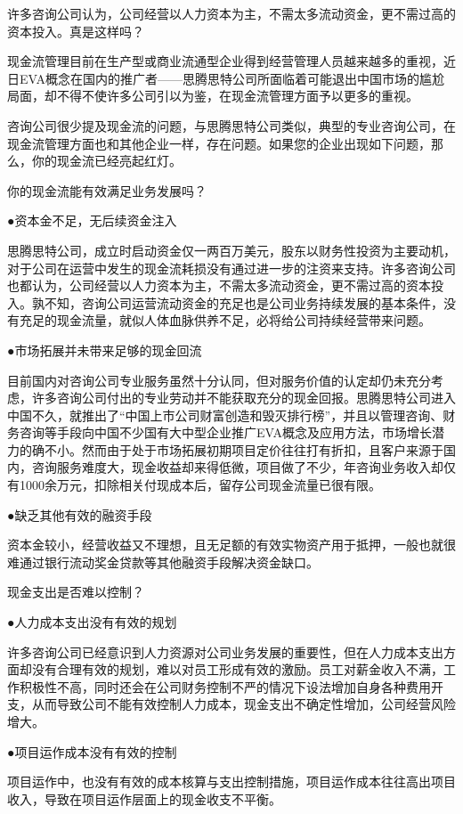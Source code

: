     许多咨询公司认为，公司经营以人力资本为主，不需太多流动资金，更不需过高的资本投入。真是这样吗？

    现金流管理目前在生产型或商业流通型企业得到经营管理人员越来越多的重视，近日EVA概念在国内的推广者——思腾思特公司所面临着可能退出中国市场的尴尬局面，却不得不使许多公司引以为鉴，在现金流管理方面予以更多的重视。

    咨询公司很少提及现金流的问题，与思腾思特公司类似，典型的专业咨询公司，在现金流管理方面也和其他企业一样，存在问题。如果您的企业出现如下问题，那么，你的现金流已经亮起红灯。

    你的现金流能有效满足业务发展吗？

    ●资本金不足，无后续资金注入

    思腾思特公司，成立时启动资金仅一两百万美元，股东以财务性投资为主要动机，对于公司在运营中发生的现金流耗损没有通过进一步的注资来支持。许多咨询公司也都认为，公司经营以人力资本为主，不需太多流动资金，更不需过高的资本投入。孰不知，咨询公司运营流动资金的充足也是公司业务持续发展的基本条件，没有充足的现金流量，就似人体血脉供养不足，必将给公司持续经营带来问题。

    ●市场拓展并未带来足够的现金回流

    目前国内对咨询公司专业服务虽然十分认同，但对服务价值的认定却仍未充分考虑，许多咨询公司付出的专业劳动并不能获取充分的现金回报。思腾思特公司进入中国不久，就推出了“中国上市公司财富创造和毁灭排行榜”，并且以管理咨询、财务咨询等手段向中国不少国有大中型企业推广EVA概念及应用方法，市场增长潜力的确不小。然而由于处于市场拓展初期项目定价往往打有折扣，且客户来源于国内，咨询服务难度大，现金收益却来得低微，项目做了不少，年咨询业务收入却仅有1000余万元，扣除相关付现成本后，留存公司现金流量已很有限。

    ●缺乏其他有效的融资手段

    资本金较小，经营收益又不理想，且无足额的有效实物资产用于抵押，一般也就很难通过银行流动奖金贷款等其他融资手段解决资金缺口。

    现金支出是否难以控制？

    ●人力成本支出没有有效的规划

    许多咨询公司已经意识到人力资源对公司业务发展的重要性，但在人力成本支出方面却没有合理有效的规划，难以对员工形成有效的激励。员工对薪金收入不满，工作积极性不高，同时还会在公司财务控制不严的情况下设法增加自身各种费用开支，从而导致公司不能有效控制人力成本，现金支出不确定性增加，公司经营风险增大。

    ●项目运作成本没有有效的控制

    项目运作中，也没有有效的成本核算与支出控制措施，项目运作成本往往高出项目收入，导致在项目运作层面上的现金收支不平衡。

